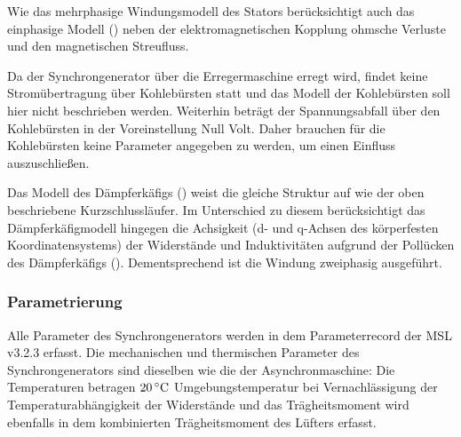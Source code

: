 Wie das mehrphasige Windungsmodell des Stators
berücksichtigt auch das einphasige Modell () neben der elektromagnetischen
Kopplung ohmsche Verluste und den magnetischen Streufluss.

Da der Synchrongenerator über die Erregermaschine erregt wird, findet
keine Stromübertragung über Kohlebürsten statt und das Modell der
Kohlebürsten soll hier nicht beschrieben werden. Weiterhin beträgt der
Spannungsabfall über den Kohlebürsten in der Voreinstellung Null Volt.
Daher brauchen für die Kohlebürsten keine Parameter angegeben zu werden,
um einen Einfluss auszuschließen.

Das Modell des Dämpferkäfigs () weist die gleiche Struktur auf
wie der oben beschriebene Kurzschlussläufer. Im Unterschied zu diesem
berücksichtigt das Dämpferkäfigmodell hingegen die Achsigkeit (d- und
q-Achsen des körperfesten Koordinatensystems) der Widerstände und
Induktivitäten aufgrund der Pollücken des Dämpferkäfigs
(\cite[S. 194]{kralModelicaObjektorientierteModellbildung2019}).
Dementsprechend ist die Windung zweiphasig ausgeführt.

\subsubsection{Parametrierung}\label{parametrierung-SG}

Alle Parameter des Synchrongenerators werden in dem Parameterrecord
der MSL v3.2.3 erfasst. Die mechanischen und thermischen Parameter des
Synchrongenerators sind dieselben wie die der Asynchronmaschine: Die
Temperaturen betragen \(\unit[20]{^\circ C}\) Umgebungstemperatur bei
Vernachlässigung der Temperaturabhängigkeit der Widerstände und das
Trägheitsmoment wird ebenfalls in dem kombinierten Trägheitsmoment des
Lüfters erfasst.

